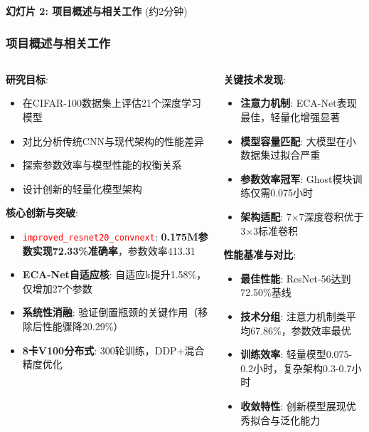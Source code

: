 \documentclass[10pt]{beamer}
\begin{document}
\begin{frame}{\textbf{幻灯片 2: 项目概述与相关工作} (约2分钟)}
\frametitle{项目概述与相关工作}

{\footnotesize
\begin{columns}[T]
    \begin{column}{0.5\textwidth}
        \textbf{研究目标}:
        \begin{itemize}
            \item 在CIFAR-100数据集上评估21个深度学习模型 \cite{Krizhevsky2009Learning}
            \item 对比分析传统CNN与现代架构的性能差异
            \item 探索参数效率与模型性能的权衡关系
            \item 设计创新的轻量化模型架构
        \end{itemize}
        
        \vspace{0.2em}
        \textbf{核心创新与突破}:
        \begin{itemize}
            \item \textcolor{red}{\texttt{improved\_resnet20\_convnext}}: \textbf{0.175M参数实现72.33\%准确率}，参数效率413.31
            \item \textbf{ECA-Net自适应核}: 自适应k提升1.58\%，仅增加27个参数
            \item \textbf{系统性消融}: 验证倒置瓶颈的关键作用（移除后性能骤降20.29\%）
            \item \textbf{8卡V100分布式}: 300轮训练，DDP+混合精度优化
        \end{itemize}
    \end{column}
    \begin{column}{0.5\textwidth}
        \textbf{关键技术发现}:
        \begin{itemize}
            \item \textbf{注意力机制}: ECA-Net表现最佳，轻量化增强显著
            \item \textbf{模型容量匹配}: 大模型在小数据集过拟合严重
            \item \textbf{参数效率冠军}: Ghost模块训练仅需0.075小时
            \item \textbf{架构适配}: 7×7深度卷积优于3×3标准卷积
        \end{itemize}
        
        \vspace{0.2em}
        \textbf{性能基准与对比}:
        \begin{itemize}
            \item \textbf{最佳性能}: ResNet-56达到72.50\%基线
            \item \textbf{技术分组}: 注意力机制类平均67.86\%，参数效率最优
            \item \textbf{训练效率}: 轻量模型0.075-0.2小时，复杂架构0.3-0.7小时
            \item \textbf{收敛特性}: 创新模型展现优秀拟合与泛化能力
        \end{itemize}
        

\end{column}
\end{columns}}
\end{frame}
\end{document}
